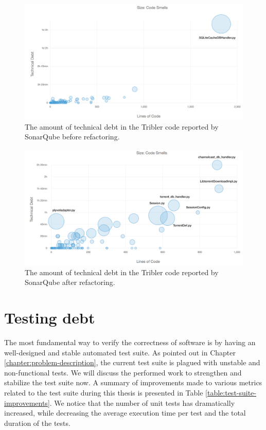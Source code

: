 \begin{figure}[h!]
	\centering
	\includegraphics[width=1.0\columnwidth]{images/improving_qa/technical_debt_core_before}
	\caption{The amount of technical debt in the Tribler code reported by SonarQube before refactoring.}
	\label{fig:technical-debt-core-before}
\end{figure}

\begin{figure}[h!]
	\centering
	\includegraphics[width=1.0\columnwidth]{images/improving_qa/technical_debt_core_after}
	\caption{The amount of technical debt in the Tribler code reported by SonarQube after refactoring.}
	\label{fig:technical-debt-core-after}
\end{figure}

\section{Testing debt}
The most fundamental way to verify the correctness of software is by having an well-designed and stable automated test suite. As pointed out in Chapter \ref{chapter:problem-description}, the current test suite is plagued with unstable and non-functional tests. We will discuss the performed work to strengthen and stabilize the test suite now. A summary of improvements made to various metrics related to the test suite during this thesis is presented in Table \ref{table:test-suite-improvements}. We notice that the number of unit tests has dramatically increased, while decreasing the average execution time per test and the total duration of the tests.

